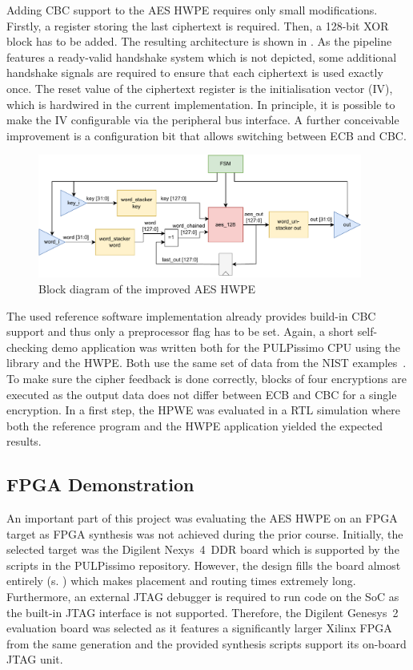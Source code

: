 \documentclass[a4paper, 12pt]{article}
\begin{document}
Adding CBC support to the AES HWPE requires only small modifications. Firstly, a register storing the last ciphertext is required. Then, a 128-bit XOR block has to be added. The resulting architecture is shown in . As the pipeline features a ready-valid handshake system which is not depicted, some additional handshake signals are required to ensure that each ciphertext is used exactly once. The reset value of the ciphertext register is the initialisation vector (IV), which is hardwired in the current implementation. In principle, it is possible to make the IV configurable via the peripheral bus interface. A further conceivable improvement is a configuration bit that allows switching between ECB and CBC.

\begin{figure} [h]
	\centering
	\includegraphics[width=0.95\textwidth]{hwpe_aes_update.pdf}
	\caption{Block diagram of the improved AES HWPE}
	\label{hwpe-aes-update}
\end{figure}

The used reference software implementation \cite{tiny-aes-c} already provides build-in CBC support and thus only a preprocessor flag has to be set. Again, a short self-checking demo application was written both for the PULPissimo CPU using the library and the HWPE. Both use the same set of data from the NIST examples~\cite{NIST}. To make sure the cipher feedback is done correctly, blocks of four encryptions are executed as the output data does not differ between ECB and CBC for a single encryption. In a first step, the HPWE was evaluated in a RTL simulation where both the reference program and the HWPE application yielded the expected results.

\subsection{FPGA Demonstration}

An important part of this project was evaluating the AES HWPE on an FPGA target as FPGA synthesis was not achieved during the prior course. Initially, the selected target was the Digilent Nexys~4~DDR board which is supported by the scripts in the PULPissimo repository. However, the design fills the board almost entirely (s. ) which makes placement and routing times extremely long. Furthermore, an external JTAG debugger is required to run code on the SoC as the built-in JTAG interface is not supported. Therefore, the Digilent Genesys~2 evaluation board was selected as it features a significantly larger Xilinx FPGA from the same generation and the provided synthesis scripts support its on-board JTAG unit.
\end{document}
